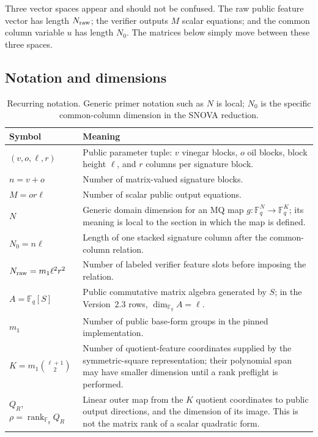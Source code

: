 \documentclass[11pt]{article}
\newcommand{\F}{\mathbb F}
\newcommand{\rank}{\operatorname{rank}}
\newcommand{\SNOVA}{\textsf{SNOVA}}
\begin{document}
Three vector spaces appear and should not be confused.  The raw public feature
vector has length $N_{\rm raw}$; the verifier outputs $M$ scalar equations; and the
common column variable $u$ has length $N_0$.  The matrices below simply move
between these three spaces.

\subsection{Notation and dimensions}\label{sec:notation}

\begin{table}[H]
\centering
\caption{Recurring notation.  Generic primer notation such as $N$ is local;
$N_0$ is the specific common-column dimension in the \SNOVA{} reduction.}
\label{tab:notation}
\small
\renewcommand{\arraystretch}{1.12}
\begin{tabularx}{0.96\textwidth}{@{}>{\raggedright\arraybackslash}p{}X@{}}
\toprule
Symbol & Meaning\\
\midrule
$(v,o,\ell,r)$ & Public parameter tuple: $v$ vinegar blocks, $o$ oil blocks,
block height $\ell$, and $r$ columns per signature block.\\
$n=v+o$ & Number of matrix-valued signature blocks.\\
$M=or\ell$ & Number of scalar public output equations.\\
$N$ & Generic domain dimension for an MQ map $g:\F_q^N\to\F_q^K$; its
meaning is local to the section in which the map is defined.\\
$N_0=n\ell$ & Length of one stacked signature column after the common-column
relation.\\
$N_{\rm raw}=m_1\ell^2r^2$ & Number of labeled verifier feature slots before imposing
the relation.\\
$A=\F_q[S]$ & Public commutative matrix algebra generated by $S$; in the
Version~2.3 rows, $\dim_{\F_q}A=\ell$.\\
$m_1$ & Number of public base-form groups in the pinned implementation.\\
$K=m_1\binom{\ell+1}{2}$ & Number of quotient-feature coordinates supplied by
the symmetric-square representation; their polynomial span may have smaller
dimension until a rank preflight is performed.\\
$Q_R$, $\rho=\rank_{\F_q}Q_R$ & Linear outer map from the $K$ quotient
coordinates to public output directions, and the dimension of its image.
This is not the matrix rank of a scalar quadratic form.\\

\end{tabularx}
\end{table}
\end{document}
